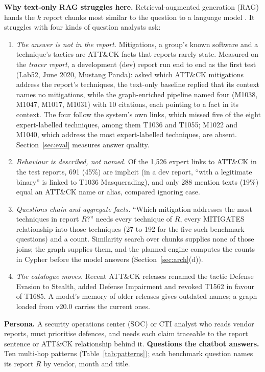 \documentclass[10pt]{article}
\begin{document}
\textbf{Why text-only RAG struggles here.} Retrieval-augmented generation (RAG) hands the $k$ report chunks most similar to the question to a language model \cite{3}. It struggles with four kinds of question analysts ask:
\begin{enumerate}[label=(\arabic*), leftmargin=*]
\item \emph{The answer is not in the report.} Mitigations, a group's known software and a technique's tactics are ATT\&CK facts that reports rarely state. Measured on the \emph{tracer report}, a development (dev) report run end to end as the first test (Lab52, June 2020, Mustang Panda): asked which ATT\&CK mitigations address the report's techniques, the text-only baseline replied that its context names no mitigations, while the graph-enriched pipeline named four (M1038, M1047, M1017, M1031) with 10 citations, each pointing to a fact in its context. The four follow the system's own links, which missed five of the eight expert-labelled techniques, among them T1036 and T1055; M1022 and M1040, which address the most expert-labelled techniques, are absent. Section~\ref{sec:eval} measures answer quality.
\item \emph{Behaviour is described, not named.} Of the 1,526 expert links to ATT\&CK in the test reports, 691 (45\%) are implicit (in a dev report, ``with a legitimate binary'' is linked to T1036 Masquerading), and only 288 mention texts (19\%) equal an ATT\&CK name or alias, compared ignoring case.
\item \emph{Questions chain and aggregate facts.} ``Which mitigation addresses the most techniques in report $R$?'' needs every technique of $R$, every MITIGATES relationship into those techniques (27 to 192 for the five such benchmark questions) and a count. Similarity search over chunks supplies none of those joins; the graph supplies them, and the planned engine computes the counts in Cypher before the model answers (Section~\ref{sec:arch}(d)).
\item \emph{The catalogue moves.} Recent ATT\&CK releases renamed the tactic Defense Evasion to Stealth, added Defense Impairment and revoked T1562 in favour of T1685. A model's memory of older releases gives outdated names; a graph loaded from v20.0 carries the current ones.
\end{enumerate}
\textbf{Persona.} A security operations center (SOC) or CTI analyst who reads vendor reports, must prioritise defences, and needs each claim traceable to the report sentence or ATT\&CK relationship behind it.
\textbf{Questions the chatbot answers.} Ten multi-hop patterns (Table~\ref{tab:patterns}); each benchmark question names its report $R$ by vendor, month and title.
\end{document}
